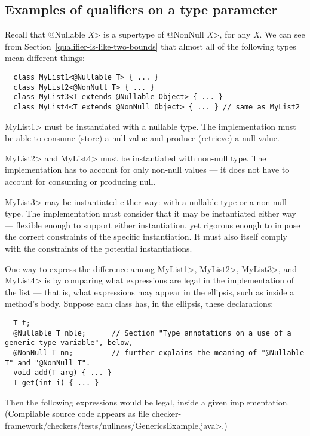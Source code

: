 \subsection{Examples of qualifiers on a type parameter}

Recall that \<@Nullable \emph{X}> is a supertype of \<@NonNull \emph{X}>,
for any \emph{X}\@.
We can see from Section~\ref{qualifier-is-like-two-bounds} that almost all
of the following types mean
different things:

\begin{Verbatim}
  class MyList1<@Nullable T> { ... }
  class MyList2<@NonNull T> { ... }
  class MyList3<T extends @Nullable Object> { ... }
  class MyList4<T extends @NonNull Object> { ... } // same as MyList2
\end{Verbatim}

\<MyList1> must be instantiated with a nullable type. 
The implementation must be able to consume (store) a null
value and produce (retrieve) a null value.

\<MyList2> and \<MyList4> must be instantiated with non-null type.
The implementation has to account for only non-null values --- it
does not have to account for consuming or producing null.

\<MyList3> may be instantiated either way:
with a nullable type or a non-null type.  The implementation must consider
that it may be instantiated either way --- flexible enough to support either
instantiation, yet rigorous enough to impose the correct constraints of the
specific instantiation.  It must also itself comply with the constraints of
the potential instantiations.

One way to express the difference
among \<MyList1>, \<MyList2>, \<MyList3>, and \<MyList4>
is by comparing what expressions are
legal in the implementation of the list --- that is, what expressions may
appear in the ellipsis, such as inside a method's body.  Suppose each class
has, in the ellipsis, these declarations:

\begin{Verbatim}
  T t;
  @Nullable T nble;      // Section "Type annotations on a use of a generic type variable", below,
  @NonNull T nn;         // further explains the meaning of "@Nullable T" and "@NonNull T".
  void add(T arg) { ... }
  T get(int i) { ... }
\end{Verbatim}

\noindent
Then the following expressions would be legal, inside a given implementation.
(Compilable source code appears as file
\<checker-framework/checkers/tests/nullness/GenericsExample.java>.)

